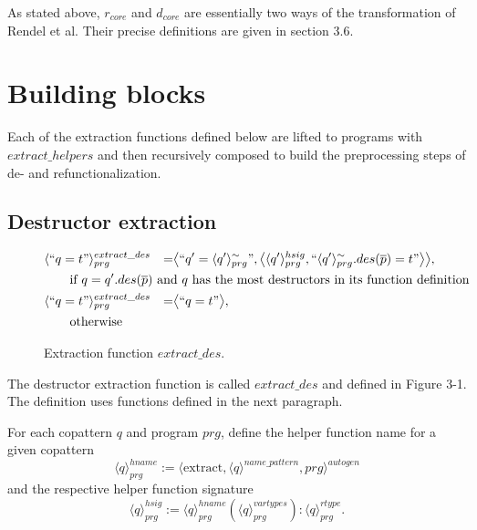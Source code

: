 As stated above, $r_{core}$ and $d_{core}$ are essentially two ways of the transformation of Rendel et al. Their precise definitions are given in section 3.6.

\section{Building blocks}

Each of the extraction functions defined below are lifted to programs with $extract\_helpers$ and then recursively composed to build the preprocessing steps of de- and refunctionalization.

\subsection{Destructor extraction}

\begin{figure}
\vspace{2.4in}
\begin{alignat*}{3}
& \langle `` q = t " \rangle^{extract\_des}_{prg} &= &\big\langle `` q' =  \langle q' \rangle^{\sim}_{prg} ", \big\langle \langle q' \rangle^{hsig}_{prg}, `` \langle q' \rangle^{\sim}_{prg}.des(\overline{p}) = t  " \big\rangle \big\rangle, \span\span \\
& \qquad \textrm{if $q = q'.des(\overline{p})$ and $q$ has the most destructors in its function definition} \span\span\span \\
& \langle `` q = t " \rangle^{extract\_des}_{prg} &= &\big\langle `` q = t " \big\rangle, \span\span \\
& \qquad \textrm{otherwise} \span\span\span
\end{alignat*}
\caption{Extraction function $extract\_des$.}
\end{figure}

The destructor extraction function is called $extract\_des$ and defined in Figure 3-1. The definition uses functions defined in the next paragraph.

For each copattern $q$ and program $prg$, define the helper function name for a given copattern
\begin{equation*}
\langle q \rangle^{hname}_{prg} := \langle \textrm{extract}, \langle q \rangle^{name\_pattern}, prg \rangle^{autogen}
\end{equation*}
and the respective helper function signature
\begin{equation*}
\langle q \rangle^{hsig}_{prg} := \langle q \rangle^{hname}_{prg}(\langle q \rangle^{vartypes}_{prg}): \langle q \rangle^{rtype}_{prg}.
\end{equation*}

